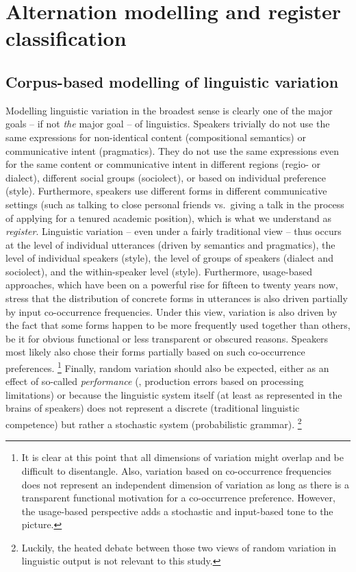 \section{Alternation modelling and register classification}

\subsection{Corpus-based modelling of linguistic variation}

Modelling linguistic variation in the broadest sense is clearly one of the major goals -- if not \textit{the} major goal -- of linguistics.
Speakers trivially do not use the same expressions for non-identical content (compositional semantics) or communicative intent (pragmatics).
They do not use the same expressions even for the same content or communicative intent in different regions (regio- or dialect), different social groups (sociolect), or based on individual preference (style).
Furthermore, speakers use different forms in different communicative settings (such as talking to close personal friends vs.\ giving a talk in the process of applying for a tenured academic position), which is what we understand as \textit{register}.
Linguistic variation -- even under a fairly traditional view -- thus occurs at the level of individual utterances (driven by semantics and pragmatics), the level of individual speakers (style), the level of groups of speakers (dialect and sociolect), and the within-speaker level (style).
Furthermore, usage-based approaches, which have been on a powerful rise for fifteen to twenty years now, stress that the distribution of concrete forms in utterances is also driven partially by input co-occurrence frequencies.
Under this view, variation is also driven by the fact that some forms happen to be more frequently used together than others, be it for obvious functional or less transparent or obscured reasons.
Speakers most likely also chose their forms partially based on such co-occurrence preferences.%
\footnote{It is clear at this point that all dimensions of variation might overlap and be difficult to disentangle.
Also, variation based on co-occurrence frequencies does not represent an independent dimension of variation as long as there is a transparent functional motivation for a co-occurrence preference.
However, the usage-based perspective adds a stochastic and input-based tone to the picture.}
Finally, random variation should also be expected, either as an effect of so-called \textit{performance} (\ie, production errors based on processing limitations) or because the linguistic system itself (at least as represented in the brains of speakers) does not represent a discrete (traditional linguistic competence) but rather a stochastic system (probabilistic grammar).%
\footnote{Luckily, the heated debate between those two views of random variation in linguistic output is not relevant to this study.}

